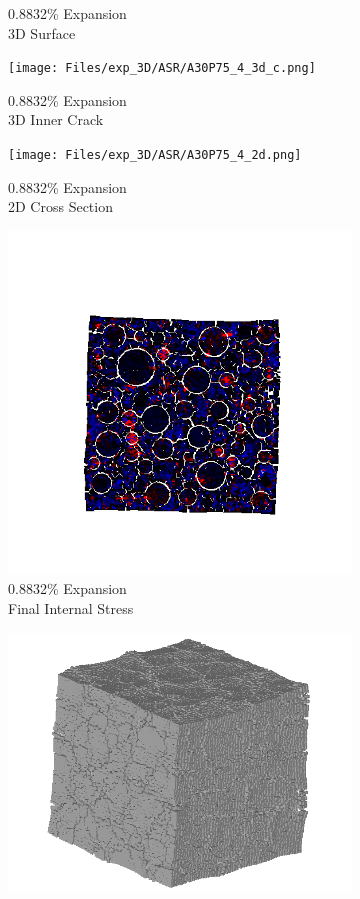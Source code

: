 \begin{figure}[ht!]
\begin{subfigure}{.25\textwidth}
      \caption{0.8832\% Expansion\\3D Surface}
    \end{subfigure}%
    \begin{subfigure}{.25\textwidth}
      \centering
      \texttt{[image: Files/exp\_3D/ASR/A30P75\_4\_3d\_c.png]}
      \caption{0.8832\% Expansion\\3D Inner Crack}
    \end{subfigure}%
    \begin{subfigure}{.25\textwidth}
      \centering
      \texttt{[image: Files/exp\_3D/ASR/A30P75\_4\_2d.png]}
      \caption{0.8832\% Expansion\\2D Cross Section}
    \end{subfigure}%
    \begin{subfigure}{.25\textwidth}
      \centering
      \includegraphics[width=.8\linewidth]{Files/exp_3D/ASR/A30P75_4_stress.png}
      \caption{0.8832\% Expansion\\Final Internal Stress}
    \end{subfigure}
    \begin{subfigure}{.25\textwidth}
      \centering
      \includegraphics[width=.8\linewidth]{Files/exp_3D/ASR/A30P75_5_3d.png}

\end{subfigure}
\end{figure}
